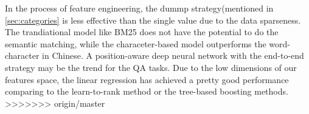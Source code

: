 \documentclass{llncs}
\begin{document}
\begin{table}[!htbp]
\begin{table}[!htbp]
\begin{table}[!htbp]
\begin{table}[!htbp]
In the process of feature engineering, the dummp strategy(mentioned in \ref{sec:categories} is less effective than the single value due {\color{red}to} the data sparseness. The trandiational model like BM25 {\color{red}does} not have the potential to do the semantic matching, while the characeter-based model outperforms the word-character in Chinese. A position-aware deep neural network with the end-to-end strategy may be the trend for the QA tasks. Due to the low dimensions of our features space, the linear {\color{red}regression} {\color{red}has} achieved a pretty {\color{red}good} performance comparing to the learn-to-rank method or the tree-based boosting methods.
>>>>>>> origin/master




\end{table}
\end{table}
\end{table}
\end{table}
\end{document}
